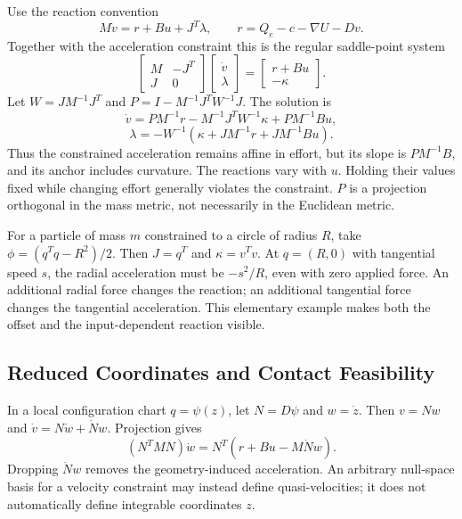Use the reaction convention
\begin{equation}
M\dot v=r+Bu+J^T\lambda,\qquad r=Q_e-c-\nabla U-Dv.
\end{equation}
Together with the acceleration constraint this is the regular saddle-point system
\begin{equation}
\begin{bmatrix}M&-J^T\\J&0\end{bmatrix}
\begin{bmatrix}\dot v\\\lambda\end{bmatrix}
=\begin{bmatrix}r+Bu\\-\kappa\end{bmatrix}.
\label{eq:ch3:DAE-system}
\end{equation}
Let $W=JM^{-1}J^T$ and $P=I-M^{-1}J^TW^{-1}J$. The solution is
\begin{equation}
\dot v=PM^{-1}r-M^{-1}J^TW^{-1}\kappa+PM^{-1}Bu,
\end{equation}
\begin{equation}
\lambda=-W^{-1}\left(\kappa+JM^{-1}r+JM^{-1}Bu\right).
\end{equation}
Thus the constrained acceleration remains affine in effort, but its slope is $PM^{-1}B$, and its anchor includes curvature. The reactions vary with $u$. Holding their values fixed while changing effort generally violates the constraint. $P$ is a projection orthogonal in the mass metric, not necessarily in the Euclidean metric.

For a particle of mass $m$ constrained to a circle of radius $R$, take $\phi=(q^Tq-R^2)/2$. Then $J=q^T$ and $\kappa=v^Tv$. At $q=(R,0)$ with tangential speed $s$, the radial acceleration must be $-s^2/R$, even with zero applied force. An additional radial force changes the reaction; an additional tangential force changes the tangential acceleration. This elementary example makes both the offset and the input-dependent reaction visible.

\subsection{Reduced Coordinates and Contact Feasibility}

In a local configuration chart $q=\psi(z)$, let $N=D\psi$ and $w=\dot z$. Then $v=Nw$ and $\dot v=N\dot w+\dot Nw$. Projection gives
\begin{equation}
(N^TMN)\dot w=N^T(r+Bu-M\dot Nw).
\label{eq:ch3:reduced-dynamics}
\end{equation}
Dropping $\dot Nw$ removes the geometry-induced acceleration. An arbitrary null-space basis for a velocity constraint may instead define quasi-velocities; it does not automatically define integrable coordinates $z$.

